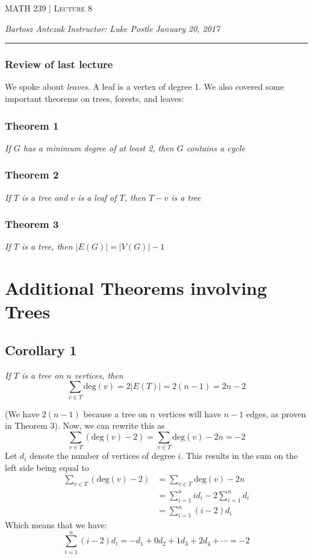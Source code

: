 \documentclass{report}
\newcommand{\lectureNum}{8}
\newcommand{\curDate}{January 20, 2017}
\newcommand{\course}{MATH 239}
\newcommand{\instructor}{Luke Postle}
\begin{document}
\begin{center}
\begin{Large}
\textsc{\course{} | Lecture \lectureNum{}}
\end{Large}
\end{center} 
\noindent \textit{Bartosz Antczak} \hfill
\textit{Instructor: \instructor{}} \hfill
\textit{\curDate{}}
\rule{\textwidth}{0.4pt}

\subsubsection{Review of last lecture}
We spoke about \textit{leaves}. A leaf is a vertex of degree 1. We also covered some important theorems on trees, forests, and leaves:
\subsubsection{Theorem 1}
\begin{center}
\textit{If $G$ has a minimum degree of at least 2, then $G$ contains a cycle}
\end{center}
\subsubsection{Theorem 2}
\begin{center}
\textit{If $T$ is a tree and $v$ is a leaf of $T$, then $T-v$ is a tree}
\end{center}
\subsubsection{Theorem 3}
\begin{center}
\textit{If $T$ is a tree, then $\vert E(G)\vert = \vert V(G) \vert -1$}
\end{center}
\section{Additional Theorems involving Trees}
\subsection{Corollary 1}
\begin{center}
\textit{If $T$ is a  tree on $n$ vertices, then}
$$\sum_{v \in T} \mathrm{deg}(v) = 2 \vert E(T) \vert = 2(n-1) = 2n - 2$$
\end{center}
(We have $2(n-1)$ because a tree on $n$ vertices will have $n-1$ edges, as proven in Theorem 3). Now, we can rewrite this as
$$\sum_{v\in T} (\mathrm{deg}(v) - 2) = \sum_{v\in T} \mathrm{deg}(v) -2n = -2$$
Let $d_i$ denote the number of vertices of degree $i$. This results in the sum on the left side being equal to
\begin{align*}
\sum_{v\in T} (\mathrm{deg}(v) - 2) &= \sum_{v\in T} \mathrm{deg}(v) - 2n\\
&= \sum_{i=1}^n id_i - 2\sum_{i=1}^n d_i \\
&= \sum_{i=1}^n (i-2)d_i
\end{align*}
Which means that we have:
$$\sum_{i=1}^n (i-2)d_i = -d_1 + 0d_2 + 1d_3 + 2d_4 + \cdots = -2$$
\end{document}
